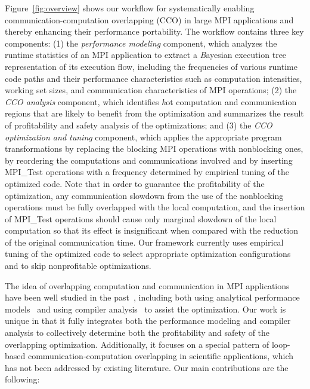 Figure~\ref{fig:overview} shows our workflow for systematically
enabling communication-computation overlapping (CCO) in large MPI
applications and thereby enhancing their performance portability.  The
workflow contains three key components: (1) the \emph{performance
  modeling} component, which analyzes the runtime statistics of an MPI
application to extract a {\emph Bayesian execution
  tree\cite{jichi:ipdps14}} representation of its execution flow,
including the frequencies of various runtime code paths and their
performance characteristics such as computation intensities, working
set sizes, and communication characteristics of MPI operations; (2)
the \emph{CCO analysis} component, which identifies {\emph hot}
computation and communication regions that are likely to benefit from
the optimization and summarizes the result of profitability and safety
analysis of the optimizations; and (3) the \emph{CCO optimization and
  tuning} component, which applies the appropriate program
transformations by replacing the blocking MPI operations with
nonblocking ones, by reordering the computations and communications
involved and by inserting MPI\_Test operations with a frequency
determined by empirical tuning of the optimized code.  Note that in
order to guarantee the profitability of the optimization, any
communication slowdown from the use of the nonblocking operations must
be fully overlapped with the local computation, and the insertion of
MPI\_Test operations should cause only marginal slowdown of the local
computation so that its effect is insignificant when compared with the
reduction of the original communication time.  Our framework currently
uses empirical tuning of the optimized code to select appropriate
optimization configurations and to skip nonprofitable optimizations.

The idea of overlapping computation and communication in MPI applications have been
well studied in the past~\cite{danalis:sc05,fishgold:ipdps06}, including both using analytical performance 
models~\cite{iancu:ppopp07}
and using compiler analysis~\cite{danalis:ics09} to assist the optimization. 
Our work is unique in that it fully integrates both the performance modeling and compiler analysis to collectively
determine both the profitability and safety of the overlapping optimization. Additionally, it
focuses on a special pattern of loop-based
communication-computation overlapping in scientific applications, which has not been addressed
by existing literature.  Our main contributions are the following:

